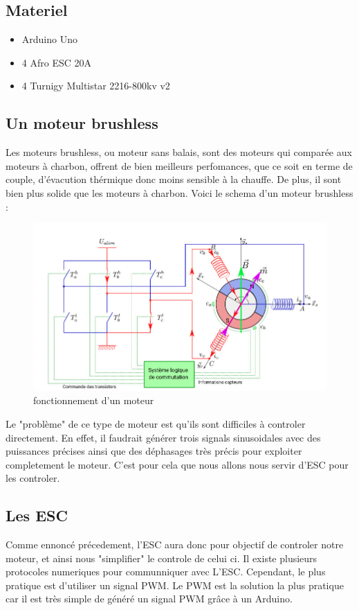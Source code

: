 \documentclass[10pt,a4paper]{article}
\begin{document}
\subsection{Materiel}
\begin{itemize}
 \item Arduino Uno
 \item 4 Afro ESC 20A
 \item 4 Turnigy Multistar 2216-800kv v2
 
\end{itemize}
\subsection{Un moteur brushless}
Les moteurs brushless, ou moteur sans balais, sont des moteurs qui comparée aux moteurs à charbon, offrent de bien meilleurs perfomances, que ce soit en terme de couple, d'évacution thérmique donc moins sensible à la chauffe. De plus, il sont bien plus solide que les moteurs à charbon. Voici le schema d'un moteur brushless : 

\begin{figure}[h!]
\centering
\includegraphics[scale=0.250]{image/1.jpg}
\caption{fonctionnement d'un moteur}
\label{fig:net}
\end{figure}
Le "problème" de ce type de moteur est qu'ils sont difficiles à controler directement. En effet, il faudrait générer trois signals sinusoidales avec des puissances précises ainsi que des déphasages très précis pour exploiter completement le moteur. C'est pour cela que nous allons nous servir d'ESC pour les controler.

\subsection{Les ESC}
 Comme ennoncé précedement, l'ESC aura donc pour objectif de controler notre moteur, et ainsi nous "simplifier" le controle de celui ci. Il existe plusieurs protocoles numeriques pour communniquer avec L'ESC. Cependant, le plus pratique est d'utiliser un signal PWM. Le PWM est la solution la plus pratique car il est très simple de généré un signal PWM grâce à un Arduino.
\end{document}
